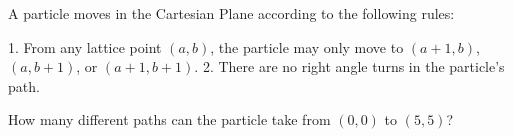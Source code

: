 A particle moves in the Cartesian Plane according to the following rules:

1.  From any lattice point $ (a,b)$, the particle may only move to $ (a + 1,b)$, $ (a,b + 1)$, or $ (a + 1,b + 1)$.
2. There are no right angle turns in the particle's path.

How many different paths can the particle take from $ (0,0)$ to $ (5,5)$?
